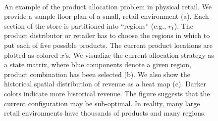 \begin{figure}[t!]
\centering
{} \\
\vspace{-4mm}

\caption{An example of the product allocation problem in physical retail. We provide a sample floor plan of a small, retail environment (a). Each section of the store is partitioned into ``regions''  (e.g., $r_1$). The product distributor or retailer has to choose the regions in which to put each of five possible products. The current product locations are plotted as colored $x$'s. We visualize the current allocation strategy as a state matrix, where blue components denote a given region, product combination has been selected (b). We also show the historical spatial distribution of revenue as a heat map (c). Darker colors indicate more historical revenue. The figure suggests that the current configuration may be sub-optimal. In reality, many large retail environments have thousands of products and many regions.}
\label{intro-fig}
\vspace{-4mm}
\end{figure}



